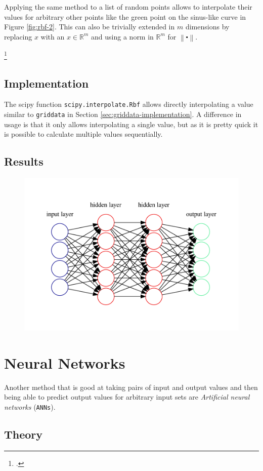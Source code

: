 Applying the same method to a list of random points allows to interpolate their values for arbitrary other points like the green point on the sinus-like curve in Figure \ref{fig:rbf-2}. This can also be trivially extended in $m$ dimensions by replacing $x$ with an $x\in\mathbb{R}^m$ and using a norm in $\mathbb{R}^m$ for $\left\|\centerdot\right\|$.

\footcite{RBF}

\subsection{Implementation}

The scipy function \texttt{scipy.interpolate.Rbf} allows directly interpolating a value similar to \texttt{griddata} in Section \ref{sec:griddata-implementation}. A difference in usage is that it only allows interpolating a single value, but as it is pretty quick it is possible to calculate multiple values sequentially.

\subsection{Results}

\begin{figure}[h] %
	\centering
	\includegraphics[width=0.4\linewidth]{images/graphviz/general.pdf}
	\caption{}
	\label{fig:neuralnetwork-general}
\end{figure}

\section{Neural Networks}

Another method that is good at taking pairs of input and output values and then being able to predict output values for arbitrary input sets are \textit{Artificial neural networks} (\texttt{ANNs}).

\subsection{Theory}

